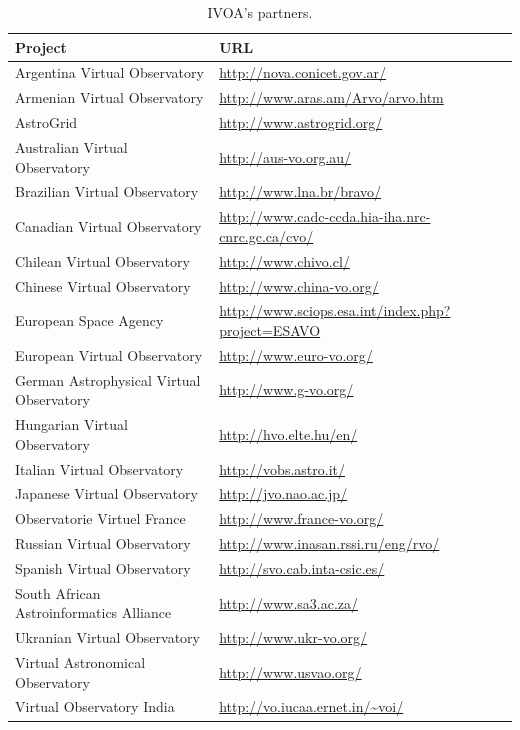 \begin{table}%
\centering
\begin{tabular}{|p{7cm}|p{7cm}|}
	\hline
	\textbf{Project} & \textbf{URL} \\
	\hline
	Argentina Virtual Observatory & \url{http://nova.conicet.gov.ar/} \\
	\hline
	Armenian Virtual Observatory & \url{http://www.aras.am/Arvo/arvo.htm} \\
	\hline
	AstroGrid & \url{http://www.astrogrid.org/} \\
	\hline
	Australian Virtual Observatory & \url{http://aus-vo.org.au/} \\
	\hline
	Brazilian Virtual Observatory & \url{http://www.lna.br/bravo/} \\
	\hline
    Canadian Virtual Observatory &
    \url{http://www.cadc-ccda.hia-iha.nrc-cnrc.gc.ca/cvo/} \\
	\hline
    Chilean Virtual Observatory & \url{http://www.chivo.cl/} \\
	\hline
    Chinese Virtual Observatory &
    \url{http://www.china-vo.org/} \\
	\hline
    European Space Agency &
    \url{http://www.sciops.esa.int/index.php?project=ESAVO} \\
	\hline
	European Virtual Observatory & \url{http://www.euro-vo.org/} \\
	\hline
	German Astrophysical Virtual Observatory & \url{http://www.g-vo.org/} \\
	\hline
	Hungarian Virtual Observatory & \url{http://hvo.elte.hu/en/} \\
	\hline
	Italian Virtual Observatory & \url{http://vobs.astro.it/} \\
	\hline
	Japanese Virtual Observatory & \url{http://jvo.nao.ac.jp/}\\
	\hline
	Observatorie Virtuel France & \url{http://www.france-vo.org/} \\
	\hline
	Russian Virtual Observatory & \url{http://www.inasan.rssi.ru/eng/rvo/} \\
	\hline
	Spanish Virtual Observatory & \url{http://svo.cab.inta-csic.es/} \\
	\hline
	South African Astroinformatics Alliance & \url{http://www.sa3.ac.za/} \\
	\hline
	Ukranian Virtual Observatory & \url{http://www.ukr-vo.org/} \\
	\hline
	Virtual Astronomical Observatory & \url{http://www.usvao.org/} \\
	\hline
	Virtual Observatory India & \url{http://vo.iucaa.ernet.in/~voi/} \\
	\hline
\end{tabular}
\caption{IVOA's partners.}
\label{table:partners}
\end{table}

